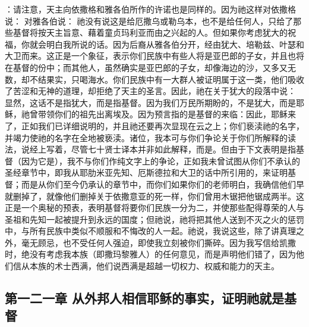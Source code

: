：请注意，天主向依撒格和雅各伯所作的许诺也是同样的。因为祂这样对依撒格说： 对雅各伯说： 祂没有说这是给厄撒乌或勒乌本，也不是给任何人，只给了那些基督将按天主旨意、藉着童贞玛利亚而由之兴起的人。但如果你考虑犹大的祝福，你就会明白我所说的话。因为后裔从雅各伯分开，经由犹大、培勒兹、叶瑟和大卫而来。这正是一个象征，表示你们民族中有些人将是亚巴郎的子女，并且也将在基督的份中；而其他人，虽然确实是亚巴郎的子女，却像海边的沙，又多又无数，却不结果实，只喝海水。你们民族中有一大群人被证明属于这一类，他们吸收了苦涩和无神的道理，却拒绝了天主的圣言。因此，祂在关于犹大的段落中说： 显然，这话不是指犹大，而是指基督。因为我们万民所期盼的，不是犹大，而是耶稣，祂曾带领你们的祖先出离埃及。因为预言指的是基督的来临：因此，耶稣来了，正如我们已详细说明的，并且祂还要再次显现在云之上；你们亵渎祂的名字，并竭力使祂的名字在全地被亵渎。诸位，我本可与你们争论关于你们所解释的读法，说经上写着，尽管七十贤士译本并非如此解释，而是。但由于下文表明是指基督（因为它是），我不与你们作纯文字上的争论，正如我未曾试图从你们不承认的圣经章节中，即我从耶肋米亚先知、厄斯德拉和大卫的话中所引用的，来证明基督；而是从你们至今仍承认的章节中，而你们如果你们的老师明白，我确信他们早就删掉了，就像他们删掉关于依撒意亚的死一样，你们曾用木锯把他锯成两半。这正是一个奥秘的预表，表明基督将要你们民族一分为二，并使那些配得尊荣的人与圣祖和先知一起被提升到永远的国度；但祂说，祂将把其他人送到不灭之火的惩罚中，与所有民族中类似不顺服和不悔改的人一起。祂说，我说这些，除了讲真理之外，毫无顾忌，也不受任何人强迫，即使我立刻被你们撕碎。因为我写信给凯撒时，绝没有考虑我本族（即撒玛黎雅人）的任何意见，而是声明他们错了，因为他们信从本族的术士西满，他们说西满是超越一切权力、权威和能力的天主。\par


\subsection{第一二一章 从外邦人相信耶稣的事实，证明祂就是基督}

